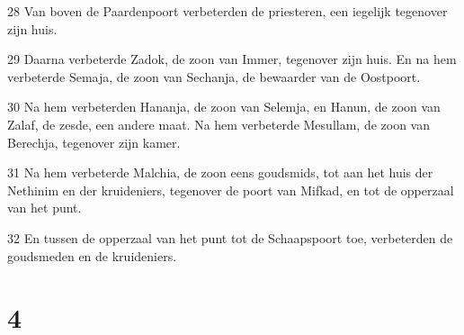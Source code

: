 \par 28 Van boven de Paardenpoort verbeterden de priesteren, een iegelijk tegenover zijn huis.
\par 29 Daarna verbeterde Zadok, de zoon van Immer, tegenover zijn huis. En na hem verbeterde Semaja, de zoon van Sechanja, de bewaarder van de Oostpoort.
\par 30 Na hem verbeterden Hananja, de zoon van Selemja, en Hanun, de zoon van Zalaf, de zesde, een andere maat. Na hem verbeterde Mesullam, de zoon van Berechja, tegenover zijn kamer.
\par 31 Na hem verbeterde Malchia, de zoon eens goudsmids, tot aan het huis der Nethinim en der kruideniers, tegenover de poort van Mifkad, en tot de opperzaal van het punt.
\par 32 En tussen de opperzaal van het punt tot de Schaapspoort toe, verbeterden de goudsmeden en de kruideniers.

\chapter{4}

